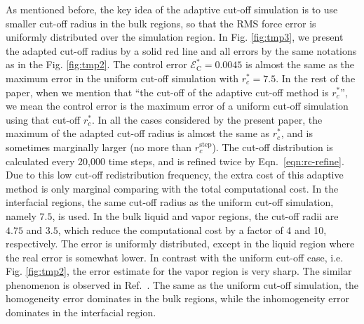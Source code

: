 \documentclass[aps, pre, preprint]{revtex4}
\begin{document}
As mentioned before, the key idea of the adaptive cut-off simulation
is to use smaller cut-off
radius in the bulk regions, so that the RMS force error is uniformly
distributed over the simulation region. In Fig. \ref{fig:tmp3}, we
present the adapted cut-off radius by a solid red line and all errors
by the same notations as in the Fig. \ref{fig:tmp2}. The control error
$\mathcal E^\ast_{\textrm{C}} = 0.0045$ is almost the same as the maximum
error in the uniform cut-off simulation with $r_c^\ast=7.5$.
{
  In the rest of the paper, when we mention that ``the cut-off of
  the adaptive cut-off method is $r_c^\ast$'', we mean the
  control error is the maximum error of a uniform cut-off simulation
  using that cut-off $r_c^\ast$. In all the cases considered by
  the present paper, the maximum of
  the adapted cut-off radius is almost the same as $r_c^\ast$,
  and is sometimes marginally larger (no more than $r_c^\textrm{step}$).
}
The
cut-off distribution is calculated every 20,000 time steps, and is
refined twice by Eqn.~\eqref{eqn:rc-refine}.
Due to this low cut-off redistribution frequency,
the extra cost of this adaptive method is only marginal
comparing with the total computational cost.
In the interfacial
regions, the same cut-off radius as the uniform cut-off simulation,
namely $7.5$, is used.  In the bulk
liquid and vapor regions, the cut-off radii are $4.75$ and $3.5$,
which reduce the computational cost
by a factor of 4 and 10, respectively.
The error is uniformly distributed, except in the
liquid region where the real error is somewhat lower.
In contrast with the uniform
cut-off case, i.e. Fig. \ref{fig:tmp2}, the error estimate for the
vapor region is very sharp.
The similar phenomenon is observed in
Ref.~\cite{wang2011}.
The same as the uniform cut-off simulation, the
homogeneity error dominates in the bulk regions, while the
inhomogeneity error dominates in the interfacial region.
\end{document}
